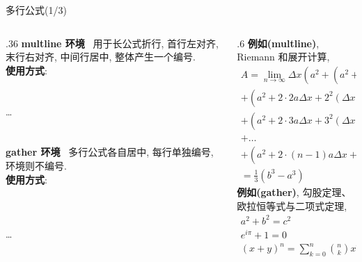 \begin{frame}{多行公式(1/3)}
	\begin{columns}[onlytextwidth]
		\begin{column}{.36\columnwidth}
			\alert{\bfseries multline 环境}~
			用于长公式折行, 首行左对齐, 末行右对齐, 中间行居中, 整体产生一个编号.\\[1ex]
			\textbf{使用方式}:\\[.5ex]
			\\
			\hspace*{1em}\cmd{\textbackslash}\\
			\hspace*{1em}\ldots\\
			\hspace*{1em}\\
			\\[3ex]

			\alert{\bfseries gather 环境}~
			多行公式各自居中, 每行单独编号,  环境则不编号.\\[1ex]
			\textbf{使用方式}:\\[.5ex]
			\\
			\hspace*{1em}\cmd{\textbackslash}\\
			\hspace*{1em}\cmd{\textbackslash}\\
			\hspace*{1em}\ldots\\
		\end{column}
		\begin{column}{.6\columnwidth}
			\textbf{例如(multline)}, Riemann 和展开计算,\\[-4ex]
			\begin{multline}
				A=\lim_{n\rightarrow\infty}\Delta x\left(a^{2}+\left(a^{2}+2a\Delta x+\left(\Delta x\right)^{2}\right)\right.\\
				+\left(a^{2}+2\cdot2a\Delta x+2^{2}\left(\Delta x\right)^{2}\right)\\
				+\left(a^{2}+2\cdot3a\Delta x+3^{2}\left(\Delta x\right)^{2}\right)\\
				+\ldots\\
				\left.+\left(a^{2}+2\cdot(n-1)a\Delta x+(n-1)^{2}\left(\Delta x\right)^{2}\right)\right)\\
				=\frac{1}{3}\left(b^{3}-a^{3}\right)
			\end{multline}
			\textbf{例如(gather)}, 勾股定理、欧拉恒等式与二项式定理,\\[-3ex]
			\begin{gather}
				a^2 + b^2 = c^2 \\
				e^{i\pi} + 1 = 0 \\
				(x+y)^n = \sum_{k=0}^{n} \binom{n}{k} x^{n-k} y^k
			\end{gather}
		\end{column}
	\end{columns}
\end{frame}

